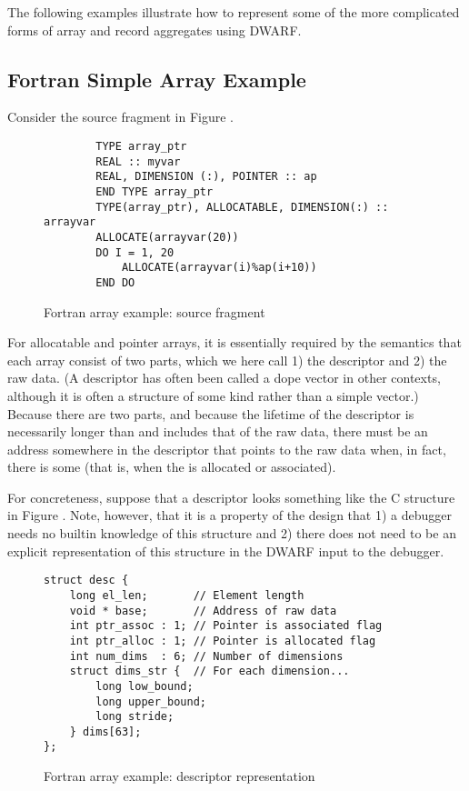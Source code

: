 The following examples illustrate how to represent some of
the more complicated forms of array and record aggregates
using DWARF.

\subsection{Fortran Simple Array Example}
\label{app:fortranarrayexample}
Consider the  source fragment in 
Figure .

\begin{figure}[ht]
\begin{lstlisting}
        TYPE array_ptr
        REAL :: myvar
        REAL, DIMENSION (:), POINTER :: ap
        END TYPE array_ptr
        TYPE(array_ptr), ALLOCATABLE, DIMENSION(:) :: arrayvar
        ALLOCATE(arrayvar(20))
        DO I = 1, 20
            ALLOCATE(arrayvar(i)%ap(i+10))
        END DO
\end{lstlisting}
\caption{Fortran array example: source fragment} 
\label{fig:fortranarrayexamplesourcefragment}
\end{figure}

For allocatable and pointer arrays, it is essentially required
by the semantics that each array 
consist of two parts, which we here call 1) the 
descriptor
and 2) the raw
data. (A descriptor has often been called a dope vector in
other contexts, although it is often a structure of some kind
rather than a simple vector.) Because there are two parts,
and because the lifetime of the descriptor is necessarily
longer than and includes that of the raw data, there must be
an address somewhere in the descriptor that points to the
raw data when, in fact, there is some (that is, when 
the  is allocated or associated).

For concreteness, suppose that a descriptor looks something
like the C structure in 
Figure .
Note, however, that it is
a property of the design that 1) a debugger needs no builtin
knowledge of this structure and 2) there does not need to
be an explicit representation of this structure in the DWARF
input to the debugger.

\begin{figure}[ht]
\begin{lstlisting}
struct desc {
    long el_len;       // Element length
    void * base;       // Address of raw data
    int ptr_assoc : 1; // Pointer is associated flag
    int ptr_alloc : 1; // Pointer is allocated flag
    int num_dims  : 6; // Number of dimensions
    struct dims_str {  // For each dimension...  
        long low_bound;
        long upper_bound;
        long stride;
    } dims[63];
};
\end{lstlisting}
\caption{Fortran array example: descriptor representation}
\label{fig:fortranarrayexampledescriptorrepresentation}
\end{figure}



